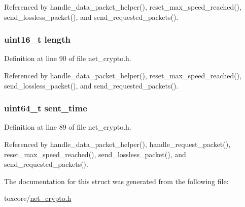 Referenced by handle\+\_\+data\+\_\+packet\+\_\+helper(), reset\+\_\+max\+\_\+speed\+\_\+reached(), send\+\_\+lossless\+\_\+packet(), and send\+\_\+requested\+\_\+packets().

\hypertarget{struct_packet___data_a1892eba2086d12ac2b09005aeb09ea3b}{
\subsubsection[{length}]{\setlength{\rightskip}{0pt plus 5cm}uint16\+\_\+t length}}\label{struct_packet___data_a1892eba2086d12ac2b09005aeb09ea3b}


Definition at line 90 of file net\+\_\+crypto.\+h.



Referenced by handle\+\_\+data\+\_\+packet\+\_\+helper(), reset\+\_\+max\+\_\+speed\+\_\+reached(), send\+\_\+lossless\+\_\+packet(), and send\+\_\+requested\+\_\+packets().

\hypertarget{struct_packet___data_ae6e5e2c139451ff48ec8dbba5d21bb50}{
\subsubsection[{sent\+\_\+time}]{\setlength{\rightskip}{0pt plus 5cm}uint64\+\_\+t sent\+\_\+time}}\label{struct_packet___data_ae6e5e2c139451ff48ec8dbba5d21bb50}


Definition at line 89 of file net\+\_\+crypto.\+h.



Referenced by handle\+\_\+data\+\_\+packet\+\_\+helper(), handle\+\_\+request\+\_\+packet(), reset\+\_\+max\+\_\+speed\+\_\+reached(), send\+\_\+lossless\+\_\+packet(), and send\+\_\+requested\+\_\+packets().



The documentation for this struct was generated from the following file\+:\begin{DoxyCompactItemize}
\item 
toxcore/\hyperlink{net__crypto_8h}{net\+\_\+crypto.\+h}\end{DoxyCompactItemize}
